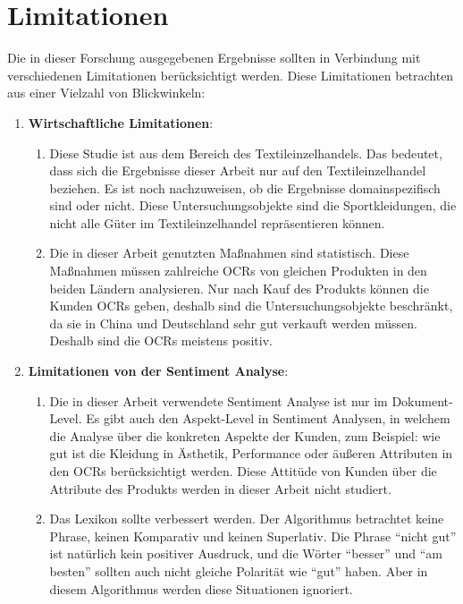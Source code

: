 \section{Limitationen}
Die in dieser Forschung ausgegebenen Ergebnisse sollten in Verbindung mit verschiedenen Limitationen berücksichtigt werden. Diese Limitationen betrachten aus einer Vielzahl von Blickwinkeln:
\begin{enumerate}
	\item \textbf{Wirtschaftliche Limitationen}: 
	\begin{enumerate}
        	\item Diese Studie ist aus dem Bereich des Textileinzelhandels. Das bedeutet, dass sich die Ergebnisse dieser Arbeit nur auf den Textileinzelhandel beziehen. Es ist noch nachzuweisen, ob die Ergebnisse domainspezifisch sind oder nicht. Diese Untersuchungsobjekte sind die Sportkleidungen, die nicht alle Güter im Textileinzelhandel repräsentieren können.
        	\item Die in dieser Arbeit genutzten Maßnahmen sind statistisch. Diese Maßnahmen müssen zahlreiche \ac{OCRs} von gleichen Produkten in den beiden Ländern analysieren. Nur nach Kauf des Produkts können die Kunden \ac{OCRs} geben, deshalb sind die Untersuchungsobjekte beschränkt, da sie in China und Deutschland sehr gut verkauft werden müssen. Deshalb sind die \ac{OCRs} meistens positiv. 
        \end{enumerate} 
	\item \textbf{Limitationen von der Sentiment Analyse}:
	\begin{enumerate}
		\item Die in dieser Arbeit verwendete Sentiment Analyse ist nur im Dokument-Level. Es gibt auch den Aspekt-Level in Sentiment Analysen, in welchem die Analyse über die konkreten Aspekte der Kunden, zum Beispiel: wie gut ist die Kleidung in Ästhetik, Performance oder äußeren Attributen in den \ac{OCRs} berücksichtigt werden. Diese Attitüde von Kunden über die Attribute des Produkts werden in dieser Arbeit nicht studiert.
		\item Das Lexikon sollte verbessert werden. Der Algorithmus betrachtet keine Phrase, keinen Komparativ und keinen Superlativ. Die Phrase ``nicht gut'' ist natürlich kein positiver Ausdruck, und die Wörter ``besser'' und ``am besten'' sollten auch nicht gleiche Polarität wie ``gut'' haben. Aber in diesem Algorithmus werden diese Situationen ignoriert. 
	\end{enumerate}

\end{enumerate}
